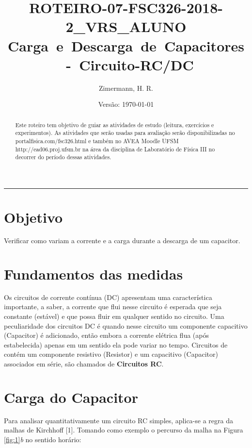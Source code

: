 \documentclass[a4paper,12pt]{article}
\begin{document}
\title{ROTEIRO-07-FSC326-2018-2\_VRS\_ALUNO   \hbox{Carga e Descarga de Capacitores - Circuito-RC/DC} } 

\author{Zimermann, H. R.}
\date{Versão: \today{}}
\maketitle

\begin{abstract}
Este roteiro tem objetivo de guiar as atividades de estudo (leitura, exercícios e experimentos). As atividades que serão usadas para avaliação serão disponibilizadas no \hbox{portalfisica.com/fsc326.html} e também no AVEA Moodle UFSM \hbox{http://ead06.proj.ufsm.br} na área da disciplina de Laboratório de Física III no decorrer do período dessas atividades.
\end{abstract}

\hrule{}

\section{Objetivo}

Verificar como variam a corrente e a carga durante a descarga de um capacitor. 

\section{Fundamentos das medidas }
 
Os circuitos de corrente contínua (DC) apresentam uma característica importante, a saber, a corrente que flui nesse circuito é esperada que seja constante (estável) e que possa fluir em qualquer sentido no circuito. Uma peculiaridade dos circuitos DC é quando nesse circuito um componente capacitivo (Capacitor) é adicionado, então embora a corrente elétrica flua (após estabelecida) apenas em um sentido ela pode variar no tempo. Circuitos de contém um componente resistivo (Resistor) e um capacitivo (Capacitor) associados em série, são chamados de \textbf{Circuitos RC}.

 
\section*{Carga do Capacitor} 

\vspace{.5ex}

Para analisar quantitativamente um circuito RC simples, aplica-se a regra da malhas de Kirchhoff [1]. Tomando como exemplo o percurso da malha na Figura \ref{fig:1}\textit{b} no sentido horário:
\end{document}
